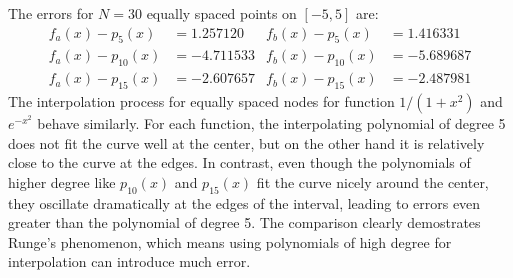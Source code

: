 \documentclass[10pt]{report}
\begin{document}
The errors for $N = 30$ equally spaced points on $[-5, 5]$ are:
\begin{align*}
	f_a(x) - p_{5}(x) &= 1.257120 & f_b(x) - p_{5}(x) &= 1.416331\\
	f_a(x) - p_{10}(x) &= -4.711533 & f_b(x) - p_{10}(x) &= -5.689687\\
	f_a(x) - p_{15}(x) &= -2.607657 & f_b(x) - p_{15}(x) &= -2.487981
\end{align*}
The interpolation process for equally spaced nodes for function $1/(1+x^2)$ and $e^{-x^2}$ behave similarly. For each function, the interpolating polynomial of degree 5 does not fit the curve well at the center, but on the other hand it is relatively close to the curve at the edges. In contrast, even though the polynomials of higher degree like $p_{10}(x)$ and $p_{15}(x)$ fit the curve nicely around the center, they oscillate dramatically at the edges of the interval, leading to errors even greater than the polynomial of degree 5. The comparison clearly demostrates Runge's phenomenon, which means using polynomials of high degree for interpolation can introduce much error.
\end{document}
